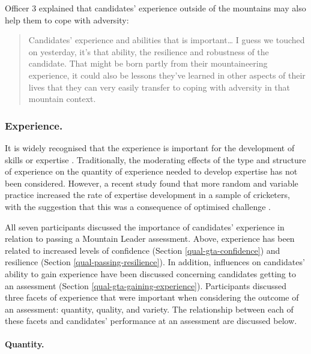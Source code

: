 \documentclass[
  12pt,
  a4paper,
]{book}
\begin{document}
Officer 3 explained that candidates' experience outside of the mountains may also help them to cope with adversity:

\begin{quote}
Candidates' experience and abilities that is important\ldots{} I guess we touched on yesterday, it's that ability, the resilience and robustness of the candidate. That might be born partly from their mountaineering experience, it could also be lessons they've learned in other aspects of their lives that they can very easily transfer to coping with adversity in that mountain context.
\end{quote}

\hypertarget{ml-qual-pass-exp}{%
\subsubsection{Experience.}\label{ml-qual-pass-exp}}

It is widely recognised that the experience is important for the development of skills or expertise \citep[cf.,][]{Baker2013, Baker2014, Ericsson1993, Jones2020}. Traditionally, the moderating effects of the type and structure of experience on the quantity of experience needed to develop expertise has not been considered. However, a recent study found that more random and variable practice increased the rate of expertise development in a sample of cricketers, with the suggestion that this was a consequence of optimised challenge \citep{Jones2020}.

All seven participants discussed the importance of candidates' experience in relation to passing a Mountain Leader assessment. Above, experience has been related to increased levels of confidence (Section \ref{qual-gta-confidence}) and resilience (Section \ref{qual-passing-resilience}). In addition, influences on candidates' ability to gain experience have been discussed concerning candidates getting to an assessment (Section \ref{qual-gta-gaining-experience}). Participants discussed three facets of experience that were important when considering the outcome of an assessment: quantity, quality, and variety. The relationship between each of these facets and candidates' performance at an assessment are discussed below.

\hypertarget{quantity.}{%
\paragraph{Quantity.}\label{quantity.}}
\end{document}

